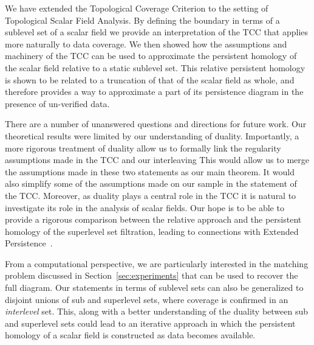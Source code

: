 
We have extended the Topological Coverage Criterion to the setting of Topological Scalar Field Analysis.
By defining the boundary in terms of a sublevel set of a scalar field we provide an interpretation of the TCC that applies more naturally to data coverage.
We then showed how the assumptions and machinery of the TCC can be used to approximate the persistent homology of the scalar field relative to a static sublevel set.
This relative persistent homology is shown to be related to a truncation of that of the scalar field as whole, and therefore provides a way to approximate a part of its persistence diagram in the presence of un-verified data.

There are a number of unanswered questions and directions for future work.
Our theoretical results were limited by our understanding of duality.
Importantly, a more rigorous treatment of duality allow us to formally link the regularity assumptions made in the TCC and our interleaving
This would allow us to merge the assumptions made in these two statements as our main theorem.
It would also simplify some of the assumptions made on our sample in the statement of the TCC.
Moreover, as duality plays a central role in the TCC it is natural to investigate its role in the analysis of scalar fields.
Our hope is to be able to provide a rigorous comparison between the relative approach and the persistent homology of the superlevel set filtration, leading to connections with Extended Persistence~\cite{cohen09extending}.

From a computational perspective, we are particularly interested in the matching problem discussed in Section~\ref{sec:experiments} that can be used to recover the full diagram.
Our statements in terms of sublevel sets can also be generalized to disjoint unions of sub and superlevel sets, where coverage is confirmed in an \emph{interlevel} set.
This, along with a better understanding of the duality between sub and superlevel sets could lead to an iterative approach in which the persistent homology of a scalar field is constructed as data becomes available.

